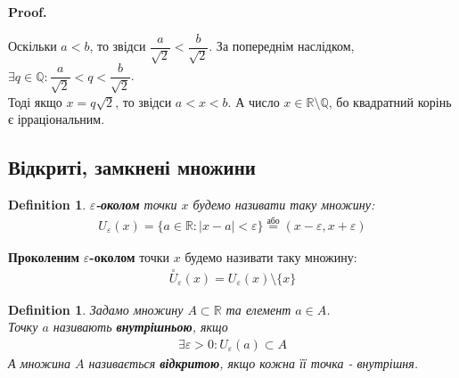 \documentclass[a4paper, 14pt]{article}
\makeatletter
\def\qed{$\blacksquare$}
\theoremstyle{theoremdd}
\theoremstyle{theoremdd}
\newtheorem{definition}[theorem]{Definition}
\theoremstyle{theoremdd}
\theoremstyle{theoremdd}
\theoremstyle{theoremdd}
\theoremstyle{theoremdd}
\theoremstyle{theoremdd}
\theoremstyle{theoremdd}
\renewenvironment{proof}[1][Proof.\\]{\par
\pushQED{\hfill \qed}%
\normalfont \topsep6\p@\@plus6\p@\relax
\trivlist
\item\relax
{\bfseries
#1\@addpunct{.}}\hspace\labelsep\ignorespaces
}{%
\popQED\endtrivlist\@endpefalse
}
\makeatother
\begin{document}
	\begin{proof}
	Оскільки $a < b$, то звідси $\dfrac{a}{\sqrt{2}} < \dfrac{b}{\sqrt{2}}$. За попереднім наслідком, $\exists q \in \mathbb{Q}: \dfrac{a}{\sqrt{2}} < q < \dfrac{b}{\sqrt{2}}$.\\
	Тоді якщо $x = q \sqrt{2}$, то звідси $a < x < b$. А число $x \in \mathbb{R} \setminus \mathbb{Q}$, бо квадратний корінь є ірраціональним.
	\end{proof}
	
	\subsection{Відкриті, замкнені множини}
	\begin{definition}
	$\varepsilon$\textbf{-околом} точки $x$ будемо називати таку множину:
	\begin{align*}
	U_{\varepsilon}(x) = \{a \in \mathbb{R}: |x-a| < \varepsilon \} \overset{\text{або}}{=} (x-\varepsilon,x+\varepsilon)
	\end{align*}
	\end{definition}
	
	\begin{figure}[H]
	\centering
	\end{figure}
	\textbf{Проколеним} $\varepsilon$\textbf{-околом} точки $x$ будемо називати таку множину:
	\begin{align*}
	\overset{\circ}{U}_{\varepsilon}(x) = U_{\varepsilon}(x) \setminus \{x\}
	\end{align*}
\begin{definition}
Задамо множину $A \subset \mathbb{R}$ та елемент $a \in A$.\\
Точку $a$ називають \textbf{внутрішньою}, якщо
\begin{align*}
\exists \varepsilon > 0: U_{\varepsilon}(a) \subset A
\end{align*}
А множина $A$ називається \textbf{відкритою}, якщо кожна її точка - внутрішня.
\end{definition}
\end{document}
